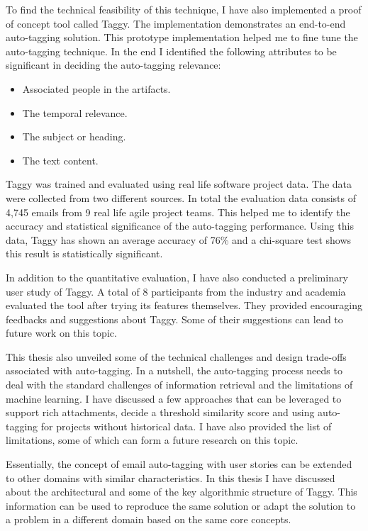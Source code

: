 To find the technical feasibility of this technique, I have also implemented a proof of concept tool called Taggy. The implementation demonstrates an end-to-end auto-tagging solution. This prototype implementation helped me to fine tune the auto-tagging technique. In the end I identified the following attributes to be significant in deciding the auto-tagging relevance:
\begin{itemize}
	\item Associated people in the artifacts.
	\item The temporal relevance.
	\item The subject or heading.
	\item The text content.	
\end{itemize}

Taggy was trained and evaluated using real life software project data. The data were collected from two different sources. In total the evaluation data consists of 4,745 emails from 9 real life agile project teams.  This helped me to identify the accuracy and statistical significance of the auto-tagging performance. Using this data, Taggy has shown an average accuracy of 76\% and a chi-square test shows this result is statistically significant.

In addition to the quantitative evaluation, I have also conducted a preliminary user study of Taggy. A total of 8 participants from the industry and academia evaluated the tool after trying its features themselves. They provided encouraging feedbacks and suggestions about Taggy. Some of their suggestions can lead to future work on this topic.

This thesis also unveiled some of the technical challenges and design trade-offs associated with auto-tagging. In a nutshell, the auto-tagging process needs to deal with the standard challenges of information retrieval and the limitations of machine learning. I have discussed a few approaches that can be leveraged to support rich attachments, decide a threshold similarity score and using auto-tagging for projects without historical data. I have also provided the list of limitations, some of which can form a future research on this topic.

Essentially, the concept of email auto-tagging with user stories can be extended to other domains with similar characteristics. In this thesis I have discussed about the architectural and some of the key algorithmic structure of Taggy. This information can be used to reproduce the same solution or adapt the solution to a problem in a different domain based on the same core concepts.



